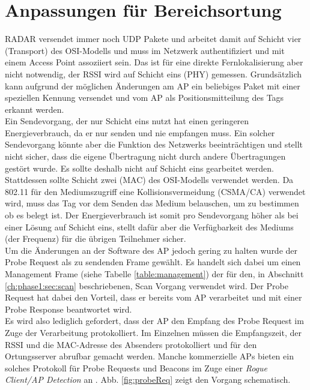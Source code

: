 \section{Anpassungen für Bereichsortung}
\label{ch:phase2:sec:anpassungbereich}
RADAR versendet immer noch UDP Pakete und arbeitet damit auf Schicht vier (Transport) des OSI-Modells und muss im Netzwerk authentifiziert und mit einem Access Point assoziiert sein.
Das ist für eine direkte Fernlokalisierung aber nicht notwendig, der RSSI wird auf Schicht eins (PHY) gemessen.
Grundsätzlich kann aufgrund der möglichen Änderungen am AP ein beliebiges Paket mit einer speziellen Kennung versendet und vom AP als Positionsmitteilung des Tags erkannt werden. \\
Ein Sendevorgang, der nur Schicht eins nutzt hat einen geringeren Energieverbrauch, da er nur senden und nie empfangen muss.
Ein solcher Sendevorgang könnte aber die Funktion des Netzwerks beeinträchtigen und stellt nicht sicher, dass die eigene Übertragung nicht durch andere Übertragungen gestört wurde.
Es sollte deshalb nicht auf Schicht eins gearbeitet werden.\\
Stattdessen sollte Schicht zwei (MAC) des OSI-Modells verwendet werden. 
Da 802.11 für den Mediumszugriff eine Kollisionsvermeidung (CSMA/CA) verwendet wird, muss das Tag vor dem Senden das Medium belauschen, um zu bestimmen ob es belegt ist.
Der Energieverbrauch ist somit pro Sendevorgang höher als bei einer Lösung auf Schicht eins, stellt dafür aber die Verfügbarkeit des Mediums (der Frequenz) für die übrigen Teilnehmer sicher. \\
Um die Änderungen an der Software des AP jedoch gering zu halten wurde der Probe Request als zu sendenden Frame gewählt.
Es handelt sich dabei um einen Management Frame (siehe Tabelle \ref{table:management}) der für den, in Abschnitt \ref{ch:phase1:sec:scan} beschriebenen, Scan Vorgang verwendet wird.
Der Probe Request hat dabei den Vorteil, dass er bereits vom AP verarbeitet und mit einer Probe Response beantwortet wird. \\
Es wird also lediglich gefordert, dass der AP den Empfang des Probe Request im Zuge der Verarbeitung protokolliert. 
Im Einzelnen müssen die Empfangszeit, der RSSI und die MAC-Adresse des Absenders protokolliert und für den Ortungsserver abrufbar gemacht werden. 
Manche kommerzielle APs bieten ein solches Protokoll für Probe Requests und Beacons im Zuge einer \textit{Rogue Client/AP Detection} an \cite{lancom2017rouge}.
Abb. \ref{fig:probeReq} zeigt den Vorgang schematisch.\\

